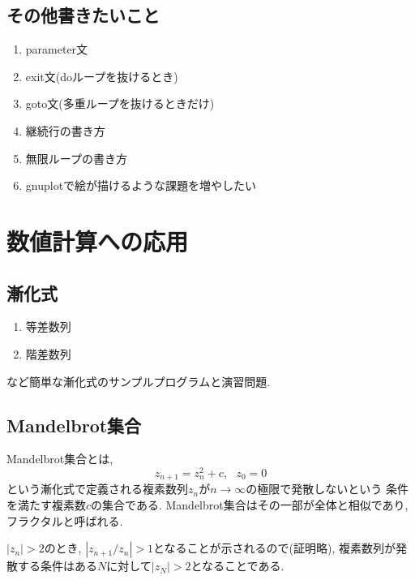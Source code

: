 \documentclass[a4j]{jsarticle}
\begin{document}
%
%
%


\subsection*{その他書きたいこと}
\begin{enumerate}
\item parameter文
\item exit文(doループを抜けるとき)
\item goto文(多重ループを抜けるときだけ)
\item 継続行の書き方
\item 無限ループの書き方
\item gnuplotで絵が描けるような課題を増やしたい
\end{enumerate}

\section{数値計算への応用}
\subsection{漸化式}
\begin{enumerate}
\item 等差数列
\item 階差数列
\end{enumerate}
など簡単な漸化式のサンプルプログラムと演習問題. 

\subsection{Mandelbrot集合}
Mandelbrot集合とは, 
\begin{equation}
z_{n+1}=z_n^2+c, \ \ \ z_0=0
\end{equation}
という漸化式で定義される複素数列$z_n$が$n \to \infty$の極限で発散しないという
条件を満たす複素数$c$の集合である. 
Mandelbrot集合はその一部が全体と相似であり, フラクタルと呼ばれる. 

$|z_n|>2$のとき, $|z_{n+1}/z_n|>1$となることが示されるので(証明略), 
複素数列が発散する条件はある$N$に対して$|z_N|>2$となることである. 
\end{document}
